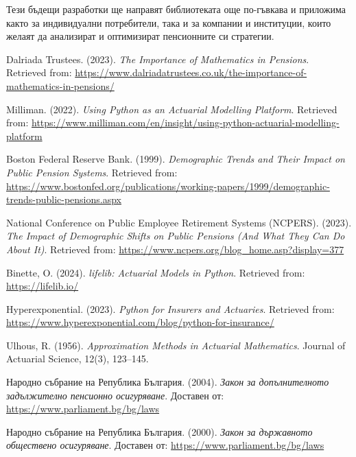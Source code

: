 \documentclass[a4paper,12pt]{article}
\begin{document}
Тези бъдещи разработки ще направят библиотеката още по-гъвкава и приложима както за индивидуални потребители, така и за компании и институции, които желаят да анализират и оптимизират пенсионните си стратегии.
\begin{thebibliography}{99}
        Dalriada Trustees. (2023).
        \emph{The Importance of Mathematics in Pensions}.
        Retrieved from: \url{https://www.dalriadatrustees.co.uk/the-importance-of-mathematics-in-pensions/}

        Milliman. (2022).
        \emph{Using Python as an Actuarial Modelling Platform}.
        Retrieved from: \url{https://www.milliman.com/en/insight/using-python-actuarial-modelling-platform}

        Boston Federal Reserve Bank. (1999).
        \emph{Demographic Trends and Their Impact on Public Pension Systems}.
        Retrieved from: \url{https://www.bostonfed.org/publications/working-papers/1999/demographic-trends-public-pensions.aspx}

        National Conference on Public Employee Retirement Systems (NCPERS). (2023).
        \emph{The Impact of Demographic Shifts on Public Pensions (And What They Can Do About It)}.
        Retrieved from: \url{https://www.ncpers.org/blog_home.asp?display=377}

        Binette, O. (2024).
        \emph{lifelib: Actuarial Models in Python}.
        Retrieved from: \url{https://lifelib.io/}

        Hyperexponential. (2023).
        \emph{Python for Insurers and Actuaries}.
        Retrieved from: \url{https://www.hyperexponential.com/blog/python-for-insurance/}

         Ulhous, R. (1956). \emph{Approximation
                Methods in Actuarial Mathematics}. Journal of Actuarial Science, 12(3),
        123–145.

        Народно събрание на Република България. (2004).
        \emph{Закон за допълнителното задължително пенсионно осигуряване}.
        Доставен от: \url{https://www.parliament.bg/bg/laws}

        Народно събрание на Република България. (2000).
        \emph{Закон за държавното обществено осигуряване}.
        Доставен от: \url{https://www.parliament.bg/bg/laws}


\end{thebibliography}
\end{document}
